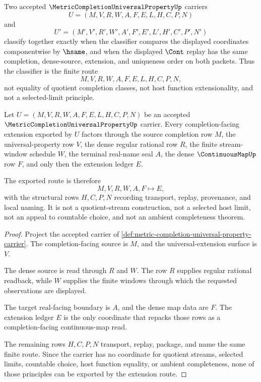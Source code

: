 \begin{definition}
\label{def:metric-completion-universal-property-classifier}
Two accepted $\MetricCompletionUniversalPropertyUp$ carriers
$$
U=(M,V,R,W,A,F,E,L,H,C,P,N)
$$
and
$$
U'=(M',V',R',W',A',F',E',L',H',C',P',N')
$$
classify together exactly when the classifier compares the displayed coordinates componentwise by $\hsame$, and when the displayed $\Cont$ replay has the same completion, dense-source, extension, and uniqueness order on both packets. Thus the classifier is the finite route
$$
M,V,R,W,A,F,E,L,H,C,P,N ,
$$
not equality of quotient completion classes, not host function extensionality, and not a selected-limit principle.
\end{definition}

\begin{theorem}
\label{thm:metric-completion-universal-property-extension-route}
Let $U=(M,V,R,W,A,F,E,L,H,C,P,N)$ be an accepted $\MetricCompletionUniversalPropertyUp$ carrier. Every completion-facing extension exported by $U$ factors through the source completion row $M$, the universal-property row $V$, the dense regular rational row $R$, the finite stream-window schedule $W$, the terminal real-name seal $A$, the dense $\ContinuousMapUp$ row $F$, and only then the extension ledger $E$.

The exported route is therefore
$$
M,V,R,W,A,F\longmapsto E ,
$$
with the structural rows $H,C,P,N$ recording transport, replay, provenance, and local naming. It is not a quotient-stream construction, not a selected host limit, not an appeal to countable choice, and not an ambient completeness theorem.
\end{theorem}
\begin{proof}
Project the accepted carrier of \autoref{def:metric-completion-universal-property-carrier}. The completion-facing source is $M$, and the universal-extension surface is $V$.

The dense source is read through $R$ and $W$. The row $R$ supplies regular rational readback, while $W$ supplies the finite windows through which the requested observations are displayed.

The target real-facing boundary is $A$, and the dense map data are $F$. The extension ledger $E$ is the only coordinate that repacks those rows as a completion-facing continuous-map read.

The remaining rows $H,C,P,N$ transport, replay, package, and name the same finite route. Since the carrier has no coordinate for quotient streams, selected limits, countable choice, host function equality, or ambient completeness, none of those principles can be exported by the extension route.
\end{proof}

